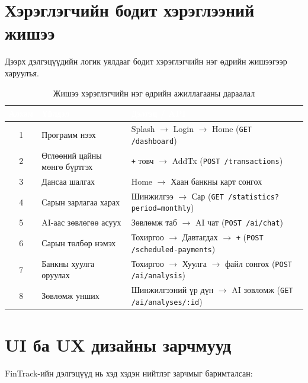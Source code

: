 \section{Хэрэглэгчийн бодит хэрэглээний жишээ}
Дээрх дэлгэцүүдийн логик уялдааг бодит хэрэглэгчийн нэг өдрийн жишээгээр харуулъя.

\begin{table}[ht]
\centering
\footnotesize
\renewcommand{\arraystretch}{1.3}
\begin{tabular}{|c|p{4cm}|p{8cm}|}
\hline
\rowcolor{darknavy}
\textcolor{white}{\textbf{Алхам}} & \textcolor{white}{\textbf{Үйлдэл}} & \textcolor{white}{\textbf{Дэлгэц / API}} \\ \hline
1 & Программ нээх             & Splash $\to$ Login $\to$ Home (\texttt{GET /dashboard}) \\ \hline
2 & Өглөөний цайны мөнгө бүртгэх & \texttt{+} товч $\to$ AddTx (\texttt{POST /transactions}) \\ \hline
3 & Дансаа шалгах             & Home $\to$ Хаан банкны карт сонгох \\ \hline
4 & Сарын зарлагаа харах      & Шинжилгээ $\to$ Сар (\texttt{GET /statistics?period=monthly}) \\ \hline
5 & AI-аас зөвлөгөө асуух     & Зөвлөмж таб $\to$ AI чат (\texttt{POST /ai/chat}) \\ \hline
6 & Сарын төлбөр нэмэх        & Тохиргоо $\to$ Давтагдах $\to$ \texttt{+} (\texttt{POST /scheduled-payments}) \\ \hline
7 & Банкны хуулга оруулах     & Тохиргоо $\to$ Хуулга $\to$ файл сонгох (\texttt{POST /ai/analysis}) \\ \hline
8 & Зөвлөмж унших             & Шинжилгээний үр дүн $\to$ AI зөвлөмж (\texttt{GET /ai/analyses/:id}) \\ \hline
\end{tabular}
\caption{Жишээ хэрэглэгчийн нэг өдрийн ажиллагааны дараалал}
\label{tab:user-flow}
\end{table}

\section{UI ба UX дизайны зарчмууд}
FinTrack-ийн дэлгэцүүд нь хэд хэдэн нийтлэг зарчмыг баримталсан:

